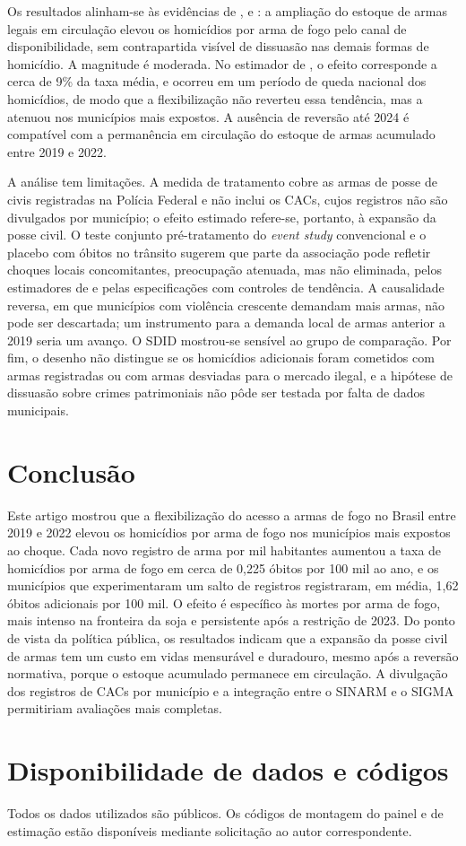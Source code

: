 \documentclass[11pt,a4paper]{article}
\begin{document}
Os resultados alinham-se às evidências de \citet{duggan2001}, \citet{cook2006} e \citet{cerqueira2012}: a ampliação do estoque de armas legais em circulação elevou os homicídios por arma de fogo pelo canal de disponibilidade, sem contrapartida visível de dissuasão nas demais formas de homicídio. A magnitude é moderada. No estimador de \citet{callaway2021}, o efeito corresponde a cerca de 9\% da taxa média, e ocorreu em um período de queda nacional dos homicídios, de modo que a flexibilização não reverteu essa tendência, mas a atenuou nos municípios mais expostos. A ausência de reversão até 2024 é compatível com a permanência em circulação do estoque de armas acumulado entre 2019 e 2022.

A análise tem limitações. A medida de tratamento cobre as armas de posse de civis registradas na Polícia Federal e não inclui os CACs, cujos registros não são divulgados por município; o efeito estimado refere-se, portanto, à expansão da posse civil. O teste conjunto pré-tratamento do \textit{event study} convencional e o placebo com óbitos no trânsito sugerem que parte da associação pode refletir choques locais concomitantes, preocupação atenuada, mas não eliminada, pelos estimadores de \citet{callaway2021} e pelas especificações com controles de tendência. A causalidade reversa, em que municípios com violência crescente demandam mais armas, não pode ser descartada; um instrumento para a demanda local de armas anterior a 2019 seria um avanço. O SDID mostrou-se sensível ao grupo de comparação. Por fim, o desenho não distingue se os homicídios adicionais foram cometidos com armas registradas ou com armas desviadas para o mercado ilegal, e a hipótese de dissuasão sobre crimes patrimoniais não pôde ser testada por falta de dados municipais.

\section{Conclusão}\label{sec:conclusao}

Este artigo mostrou que a flexibilização do acesso a armas de fogo no Brasil entre 2019 e 2022 elevou os homicídios por arma de fogo nos municípios mais expostos ao choque. Cada novo registro de arma por mil habitantes aumentou a taxa de homicídios por arma de fogo em cerca de 0{,}225 óbitos por 100 mil ao ano, e os municípios que experimentaram um salto de registros registraram, em média, 1{,}62 óbitos adicionais por 100 mil. O efeito é específico às mortes por arma de fogo, mais intenso na fronteira da soja e persistente após a restrição de 2023. Do ponto de vista da política pública, os resultados indicam que a expansão da posse civil de armas tem um custo em vidas mensurável e duradouro, mesmo após a reversão normativa, porque o estoque acumulado permanece em circulação. A divulgação dos registros de CACs por município e a integração entre o SINARM e o SIGMA permitiriam avaliações mais completas.

\section*{Disponibilidade de dados e códigos}
Todos os dados utilizados são públicos. Os códigos de montagem do painel e de estimação estão disponíveis mediante solicitação ao autor correspondente.



\end{document}
